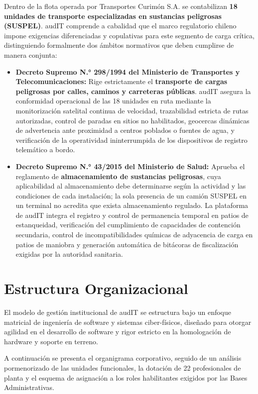 Dentro de la flota operada por Transportes Curimón S.A. se contabilizan \textbf{18 unidades de transporte especializadas en sustancias peligrosas (SUSPEL)}. audIT comprende a cabalidad que el marco regulatorio chileno impone exigencias diferenciadas y copulativas para este segmento de carga crítica, distinguiendo formalmente dos ámbitos normativos que deben cumplirse de manera conjunta:

\begin{itemize}
  \item \textbf{Decreto Supremo N.° 298/1994 del Ministerio de Transportes y Telecomunicaciones:} Rige estrictamente el \textbf{transporte de cargas peligrosas por calles, caminos y carreteras públicas}. audIT asegura la conformidad operacional de las 18 unidades en ruta mediante la monitorización satelital continua de velocidad, trazabilidad estricta de rutas autorizadas, control de paradas en sitios no habilitados, geocercas dinámicas de advertencia ante proximidad a centros poblados o fuentes de agua, y verificación de la operatividad ininterrumpida de los dispositivos de registro telemático a bordo.
  \item \textbf{Decreto Supremo N.° 43/2015 del Ministerio de Salud:} Aprueba el reglamento de \textbf{almacenamiento de sustancias peligrosas}, cuya aplicabilidad al almacenamiento debe determinarse según la actividad y las condiciones de cada instalación; la sola presencia de un camión SUSPEL en un terminal no acredita que exista almacenamiento regulado. La plataforma de audIT integra el registro y control de permanencia temporal en patios de estanqueidad, verificación del cumplimiento de capacidades de contención secundaria, control de incompatibilidades químicas de adyacencia de carga en patios de maniobra y generación automática de bitácoras de fiscalización exigidas por la autoridad sanitaria.
\end{itemize}

\section{Estructura Organizacional}\label{sec:1-organizacion}

El modelo de gestión institucional de audIT se estructura bajo un enfoque matricial de ingeniería de software y sistemas ciber-físicos, diseñado para otorgar agilidad en el desarrollo de software y rigor estricto en la homologación de hardware y soporte en terreno.

A continuación se presenta el organigrama corporativo, seguido de un análisis pormenorizado de las unidades funcionales, la dotación de 22 profesionales de planta y el esquema de asignación a los roles habilitantes exigidos por las Bases Administrativas.

